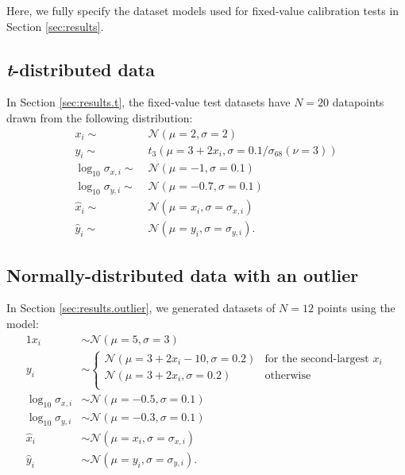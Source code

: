 \documentclass[fleqn,usenatbib]{rasti}
\begin{document}
Here, we fully specify the dataset models used for fixed-value
calibration tests in Section \ref{sec:results}.

\subsection{\textit{t}-distributed data}
\label{sec:data-models.t}

In Section \ref{sec:results.t}, the fixed-value test datasets have $N = 20$
datapoints drawn from the following distribution:
\begin{align}
    x_i \sim&\; \mathcal N (\mu = 2, \sigma = 2) \\
    y_i \sim&\; t_{3} (\mu = 3 + 2 x_i, \sigma = 0.1 / \sigma_{68}(\nu = 3)) \\
    \log_{10} \sigma_{x, i} \sim&\; \mathcal N (\mu = -1, \sigma = 0.1) \\
    \log_{10} \sigma_{y, i} \sim&\; \mathcal N (\mu = -0.7, \sigma = 0.1) \\
    \hat{x}_i \sim&\; \mathcal N (\mu = x_i, \sigma = \sigma_{x, i}) \\
    \hat{y}_i \sim&\; \mathcal N (\mu = y_i, \sigma = \sigma_{y, i}).
\end{align}

\subsection{Normally-distributed data with an outlier}
\label{sec:data-models.outlier}

In Section \ref{sec:results.outlier}, we generated datasets of $N = 12$ points
using the model:
\begin{alignat}{1}
    x_i& \sim \mathcal N (\mu = 5, \sigma = 3) \\
    y_i& \sim
    \begin{cases}
        \mathcal N (\mu = 3 + 2 x_i - 10, \sigma = 0.2) &
            \text{for the second-largest $x_i$} \\
        \mathcal N (\mu = 3 + 2 x_i, \sigma = 0.2) &
            \text{otherwise} \\
    \end{cases}\\
    \log_{10} \sigma_{x, i}& \sim \mathcal N (\mu = -0.5, \sigma = 0.1) \\
    \log_{10} \sigma_{y, i}& \sim \mathcal N (\mu = -0.3, \sigma = 0.1) \\
    \hat{x}_i& \sim \mathcal N (\mu = x_i, \sigma = \sigma_{x, i}) \\
    \hat{y}_i& \sim \mathcal N (\mu = y_i, \sigma = \sigma_{y, i}).
\end{alignat}
\end{document}
